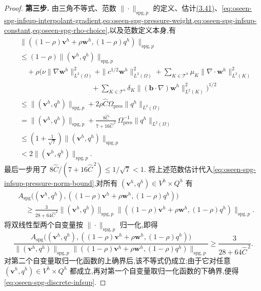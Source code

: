 \begin{proof}
\noindent\textbf{第三步.} 由三角不等式、范数 $\|\cdot\|_{\mathrm{spg},p}$ 的定义、估计\hyperref[eq:divergence-gradient-bound-h1]{(3.41)}、\cref{eq:oseen-spg-infsup-interpolant-gradient,eq:oseen-spg-pressure-weight,eq:oseen-spg-infsup-constant,eq:oseen-spg-rho-choice},以及范数定义本身,有
\begin{equation*}
\begin{aligned}
 &\|((1-\rho)\bm{v}^h+\rho\bm{w}^h,(1-\rho)q^h)\|_{\mathrm{spg},p}\\
 &\le(1-\rho)\|(\bm{v}^h,q^h)\|_{\mathrm{spg},p}\\
 &\quad+\rho\Biggl(\nu\|\nabla\bm{w}^h\|_{L^2(\Omega)}^2
       +\|c^{1/2}\bm{w}^h\|_{L^2(\Omega)}^2
       +\sum_{K\in\mathcal{T}^h}
          \mu_K\|\nabla\cdot\bm{w}^h\|_{L^2(K)}^2\\
 &\hspace{10em}
       +\sum_{K\in\mathcal{T}^h}
          \delta_K\|(\bm{b}\cdot\nabla)\bm{w}^h\|_{L^2(K)}^2
          \Biggr)^{1/2}\\
 &\le\|(\bm{v}^h,q^h)\|_{\mathrm{spg},p}
       +2\rho\widehat C\Omega_{\mathrm{pres}}\|q^h\|_{L^2(\Omega)}\\
 &=\|(\bm{v}^h,q^h)\|_{\mathrm{spg},p}
       +\frac{8\widehat C}{7+16\widehat C^{\,2}}\,
          \Omega_{\mathrm{pres}}^{-1}\|q^h\|_{L^2(\Omega)}\\
 &\le\left(1+\frac1{\sqrt7}\right)
       \|(\bm{v}^h,q^h)\|_{\mathrm{spg},p}\\
 &<2\|(\bm{v}^h,q^h)\|_{\mathrm{spg},p}.
\end{aligned}
\end{equation*}
最后一步用了
$8\widehat C/(7+16\widehat C^{\,2})\le1/\sqrt7<1$.
将上述范数估计代入\cref{eq:oseen-spg-infsup-pressure-norm-bound},对所有 $(\bm{v}^h,q^h)\in V^h\times Q^h$ 有
\begin{equation*}
\begin{aligned}
 &A_{\mathrm{spg}}\bigl((\bm{v}^h,q^h),
       ((1-\rho)\bm{v}^h+\rho\bm{w}^h,(1-\rho)q^h)\bigr)\\
 &\quad\ge\frac{3}{28+64\widehat C^{\,2}}
       \|(\bm{v}^h,q^h)\|_{\mathrm{spg},p}
       \|((1-\rho)\bm{v}^h+\rho\bm{w}^h,(1-\rho)q^h)\|_{\mathrm{spg},p}.
\end{aligned}
\end{equation*}
将双线性型两个自变量按 $\|\cdot\|_{\mathrm{spg},p}$ 归一化,即得
\begin{equation}\label{eq:oseen-spg-discrete-infsup-normalized}
 \frac{A_{\mathrm{spg}}\bigl((\bm{v}^h,q^h),
       ((1-\rho)\bm{v}^h+\rho\bm{w}^h,(1-\rho)q^h)\bigr)}
      {\|(\bm{v}^h,q^h)\|_{\mathrm{spg},p}
       \|((1-\rho)\bm{v}^h+\rho\bm{w}^h,(1-\rho)q^h)\|_{\mathrm{spg},p}}
 \ge\frac{3}{28+64\widehat C^{\,2}}.
\end{equation}
对第二个自变量取归一化函数的上确界后,该不等式仍成立;由于它对任意 $(\bm{v}^h,q^h)\in V^h\times Q^h$ 都成立,再对第一个自变量取归一化函数的下确界,便得\cref{eq:oseen-spg-discrete-infsup}.
\end{proof}

